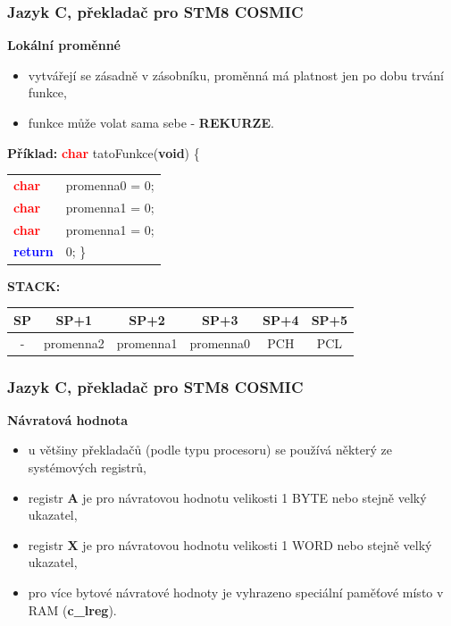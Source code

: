 	\begin{frame}
    \frametitle{Jazyk C, překladač pro STM8 \textbf{COSMIC}}
		
		\small
		\textbf{Lokální proměnné}
		
		\begin{itemize}
			\item vytvářejí se zásadně v zásobníku, proměnná má platnost jen po dobu trvání funkce,
			\item funkce může volat sama sebe - \textbf{REKURZE}.
		\end{itemize}
		
		\vspace{4mm}
		
		\textbf{Příklad:} \hspace{15mm}\textcolor{red}{\textbf{char}} tatoFunkce(\textbf{void}) \{
		\begin{center}
			\begin{tabular}{l l}
				\textcolor{red}{\textbf{char}} & promenna0 = 0;\\
				\textcolor{red}{\textbf{char}} & promenna1 = 0;\\
				\textcolor{red}{\textbf{char}} & promenna1 = 0;\\
				\textcolor{blue}{\textbf{return}} & 0; \}
			\end{tabular}
		\end{center}

		\begin{center}
		\textbf{STACK:}
			\begin{tabular}{| c | c | c | c | c | c |}
				\hline
				\textbf{SP} & \textbf{SP+1} & \textbf{SP+2} & \textbf{SP+3} & \textbf{SP+4} & \textbf{SP+5} \\
				\hline
				- & promenna2 & promenna1 & promenna0 & PCH & PCL \\
				\hline
			\end{tabular}
		\end{center}

	\end{frame}
	
	\begin{frame}
    \frametitle{Jazyk C, překladač pro STM8 \textbf{COSMIC}}
		
		\small
		\textbf{Návratová hodnota}
		
		\begin{itemize}
			\item u většiny překladačů (podle typu procesoru) se používá některý ze systémových registrů,
			\item registr \textbf{A} je pro návratovou hodnotu velikosti 1 BYTE nebo stejně velký ukazatel,
			\item registr \textbf{X} je pro návratovou hodnotu velikosti 1 WORD nebo stejně velký ukazatel,
			\item pro více bytové návratové hodnoty je vyhrazeno speciální paměťové místo v RAM (\textbf{c\_lreg}).
		\end{itemize}

	\end{frame}